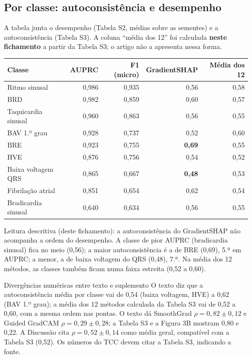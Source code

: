 \documentclass[11pt,a4paper]{article}
\begin{document}
\subsection{Por classe: autoconsistência e desempenho}
A tabela junta o desempenho (Tabela S2, médias sobre as sementes) e a autoconsistência (Tabela S3). A coluna “média dos 12” foi calculada \textbf{neste fichamento} a partir da Tabela S3; o artigo não a apresenta nessa forma.
\begin{center}\small
\begin{tabular}{lrrrr}
\toprule
\textbf{Classe} & \textbf{AUPRC} & \textbf{F1 (micro)} & \textbf{GradientSHAP} & \textbf{Média dos 12} \\
\midrule
Ritmo sinusal & 0,986 & 0,935 & 0,56 & 0,58 \\
BRD & 0,982 & 0,859 & 0,60 & 0,57 \\
Taquicardia sinusal & 0,960 & 0,863 & 0,56 & 0,55 \\
BAV 1.º grau & 0,928 & 0,737 & 0,52 & 0,60 \\
BRE & 0,923 & 0,755 & \textbf{0,69} & 0,55 \\
HVE & 0,876 & 0,756 & 0,54 & 0,52 \\
Baixa voltagem QRS & 0,865 & 0,667 & \textbf{0,48} & 0,53 \\
Fibrilação atrial & 0,851 & 0,654 & 0,62 & 0,54 \\
Bradicardia sinusal & 0,640 & 0,634 & 0,56 & 0,55 \\
\bottomrule
\end{tabular}
\end{center}
Leitura descritiva (deste fichamento): a autoconsistência do GradientSHAP não acompanha a ordem do desempenho. A classe de pior AUPRC (bradicardia sinusal) fica no meio (0,56); a maior autoconsistência é a de BRE (0,69), 5.ª em AUPRC; a menor, a de baixa voltagem do QRS (0,48), 7.ª. Na média dos 12 métodos, as classes também ficam numa faixa estreita (0,52 a 0,60).

\begin{infobox}[warn]{Divergências numéricas entre texto e suplemento}
O texto diz que a autoconsistência média por classe vai de 0,54 (baixa voltagem, HVE) a 0,62 (BAV 1.º grau); a média dos 12 métodos calculada da Tabela S3 vai de 0,52 a 0,60, com a mesma ordem nas pontas. O texto dá SmoothGrad $\rho = 0{,}82 \pm 0{,}12$ e Guided GradCAM $\rho = 0{,}29 \pm 0{,}28$; a Tabela S3 e a Figura 3B mostram 0,80 e 0,22. A Discussão cita $\rho = 0{,}52 \pm 0{,}14$ como média geral, compatível com a Tabela S3 (0,52). Os números do TCC devem citar a Tabela S3, indicando a fonte.
\end{infobox}
\end{document}
